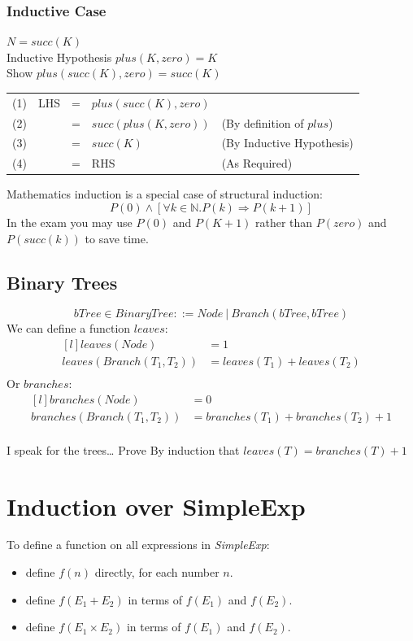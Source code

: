 \subsubsection*{Inductive Case}
$N = succ(K)$
\\ Inductive Hypothesis $plus(K, zero) = K$
\\ Show $plus(succ(K), zero) = succ(K)$
\begin{center}
    \begin{tabular}{c r c l l}
        (1) & LHS & = & $plus(succ(K), zero)$                             \\
        (2) &     & = & $succ(plus(K, zero))$ & (By definition of $plus$) \\
        (3) &     & = & $succ(K)$             & (By Inductive Hypothesis) \\
        (4) &     & = & RHS                   & (As Required)             \\
    \end{tabular}
\end{center}
\noindent 
Mathematics induction is a special case of structural induction:
\[P(0) \land [\forall k \in \mathbb{N}. P(k) \Rightarrow P(k + 1)]\]
In the exam you may use $P(0)$ and $P(K+1)$ rather than $P(zero)$ and $P(succ(k))$ to save time.

\subsection{Binary Trees}
\[bTree \in BinaryTree ::= Node \ | \ Branch(bTree, bTree)\]
We can define a function $leaves$:
\[\begin{matrix*}[l]
    leaves(Node) & = 1 \\
    leaves(Branch(T_1, T_2)) & = leaves(T_1) + leaves(T_2) \\
\end{matrix*}\]
Or $branches$:
\[\begin{matrix*}[l]
    branches(Node) & = 0 \\
    branches(Branch(T_1,T_2)) & = branches(T_1) + branches(T_2) + 1 \\    
\end{matrix*}\]
    
\begin{examplebox}{I speak for the trees\dots}
    Prove By induction that $leaves(T) = branches(T) + 1$
    \tcblower
    \unfinished
\end{examplebox}

\section{Induction over SimpleExp}
To define a function on all expressions in \textit{SimpleExp}:
\begin{itemize}
	\item define $f(n)$ directly, for each number $n$.
	\item define $f(E_1 + E_2)$ in terms of $f(E_1)$ and $f(E_2)$.
	\item define $f(E_1 \times E_2)$ in terms of $f(E_1)$ and $f(E_2)$.
\end{itemize}

